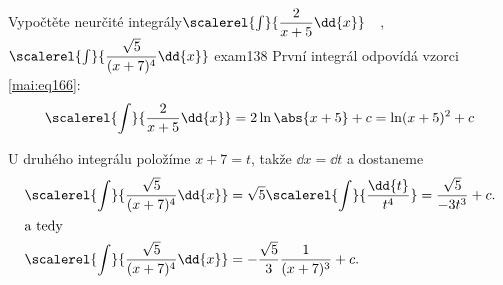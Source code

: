 \begin{mathexam}{Vypočtěte neurčité integrály\newline \(\scalerel{\int}{\dfrac{2}{x+5}\dd{x}}\quad\),
  \(\scalerel{\int}{\dfrac{\sqrt{5}}{(x+7)^4}\dd{x}}\) \hfill\cite[s.~71]{Knichal}}{exam138}
    První integrál odpovídá vzorci \ref{mai:eq166}:
    \begin{equation*}
      \scalerel{\int}{\dfrac{2}{x+5}\dd{x}} = 2\ln\abs{x+5} + c = \ln(x+5)^2 + c
    \end{equation*}

    U druhého integrálu položíme \(x+7 = t\), takže \(\dd{x} = \dd{t}\) a dostaneme
    \begin{align*}
      \scalerel{\int}{\dfrac{\sqrt{5}}{(x+7)^4}\dd{x}} &= 
      \sqrt{5}\scalerel{\int}{\dfrac{\dd{t}}{t^4}} = \dfrac{\sqrt{5}}{-3t^3} + c.   \\
      \shortintertext{a tedy}
      \scalerel{\int}{\dfrac{\sqrt{5}}{(x+7)^4}\dd{x}} &=-\dfrac{\sqrt{5}}{3}\dfrac{1}{(x+7)^3} + c.
    \end{align*}
\end{mathexam}